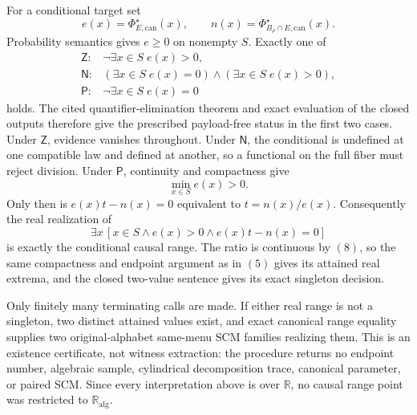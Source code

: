 For a conditional target set
\[
e(x)=\Phi_{E,\mathrm{can}}^\star(x),
\qquad
n(x)=\Phi_{B_\rho\cap E,\mathrm{can}}^\star(x).
\tag{6}
\]
Probability semantics gives \(e\geq0\) on nonempty \(S\).  Exactly one of
\[
\begin{array}{ll}
\mathsf Z:&\neg\exists x\in S\;e(x)>0,\\
\mathsf N:&(\exists x\in S\;e(x)=0)\wedge
(\exists x\in S\;e(x)>0),\\
\mathsf P:&\neg\exists x\in S\;e(x)=0
\end{array}
\tag{7}
\]
holds.  The cited quantifier-elimination theorem and exact evaluation of the closed
outputs therefore give the prescribed payload-free status in the first two cases.
Under \(\mathsf Z\), evidence vanishes throughout.  Under \(\mathsf N\), the
conditional is undefined at one compatible law and defined at another, so a
functional on the full fiber must reject division.  Under \(\mathsf P\), continuity
and compactness give
\[
\min_{x\in S}e(x)>0.
\tag{8}
\]
Only then is \(e(x)t-n(x)=0\) equivalent to \(t=n(x)/e(x)\).  Consequently the real
realization of
\[
\exists x\,[x\in S\wedge e(x)>0\wedge e(x)t-n(x)=0]
\tag{9}
\]
is exactly the conditional causal range.  The ratio is continuous by \((8)\), so
the same compactness and endpoint argument as in \((5)\) gives its attained real
extrema, and the closed two-value sentence gives its exact singleton decision.

Only finitely many terminating calls are made.  If either real range is not a
singleton, two distinct attained values exist, and exact canonical range equality
supplies two original-alphabet same-menu SCM families realizing them.  This is an
existence certificate, not witness extraction: the procedure returns no endpoint
number, algebraic sample, cylindrical decomposition trace, canonical parameter, or
paired SCM.  Since every interpretation above is over \(\mathbb R\), no causal
range point was restricted to \(\mathbb R_{\mathrm{alg}}\).